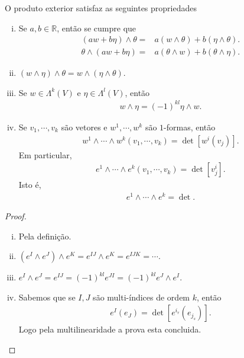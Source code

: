 \begin{proposition}
  O produto exterior satisfaz as seguintes propriedades
  \begin{enumerate}[i)]
    \item Se $a,b\in\mathbb{R}$, então se cumpre que
      \begin{align*}
        (aw+b\eta)\wedge\theta=&a(w\wedge\theta)+b(\eta\wedge\theta).\\
        \theta\wedge(aw+b\eta)=&a(\theta\wedge w)+b(\theta\wedge\eta).
      \end{align*}
    \item $(w\wedge\eta)\wedge\theta=w\wedge(\eta\wedge\theta)$.
    \item Se $w\in\Lambda^{k}(V)$ e $\eta\in\Lambda^{l}(V)$, então
      \begin{align*}
        w\wedge\eta=(-1)^{kl}\eta\wedge w.
      \end{align*}
    \item Se $v_1,\cdots,v_k$ são vetores e $w^{1},\cdots,w^{k}$ são $1$-formas, então
      \begin{align*}
        w^{1}\wedge\cdots\wedge w^{k}(v_1,\cdots,v_k)=\det\left[ w^{i}(v_j) \right].
      \end{align*}
      Em particular,
      \begin{align*}
        e^{1}\wedge\cdots\wedge e^{k}(v_1,\cdots,v_k)=\det\left[ v^{i}_{j} \right].
      \end{align*}
      Isto é,
      \begin{align*}
        e^{1}\wedge\cdots\wedge e^{k}=\det.
      \end{align*}
  \end{enumerate}
\end{proposition}
\begin{proof} 
  \begin{enumerate}[i)]
    \item Pela definição.\\
    \item $(e^{I}\wedge e^{J})\wedge e^{K}=e^{IJ}\wedge e^{K}=e^{IJK}=\cdots$.
    \item $e^{I}\wedge e^{J}=e^{IJ}=(-1)^{kl}e^{JI}=(-1)^{kl}e^{J}\wedge e^{I}$.
    \item Sabemos que se $I,J$ são multi-índices de ordem $k$, então 
      \begin{align*}
        e^{I}(e_J)=\det\left[ e^{i_r}(e_{j_s}) \right].
      \end{align*}
      Logo pela multilinearidade a prova esta concluida.
  \end{enumerate}
\end{proof}
